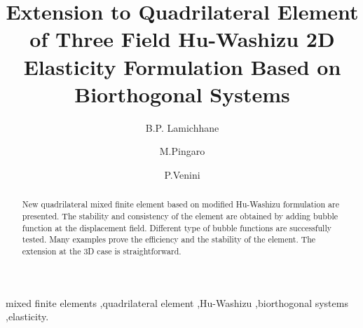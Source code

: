\documentclass[preprint,12pt,authoryear]{elsarticle}
\begin{document}
\begin{frontmatter}




\title{Extension to Quadrilateral Element of Three 
Field Hu-Washizu 2D Elasticity Formulation Based on Biorthogonal Systems}


\author{B.P. Lamichhane}
\author{M.Pingaro}
\author{P.Venini}

\address{School of Mathematical and Physical Sciences, University of Newcastle, Callaghan, NSW 2308 }
\address{Department of Civil Engineering and Architecture,
University of Pavia, Pavia, Italy }



\begin{abstract}
New quadrilateral mixed finite element based on modified Hu-Washizu formulation are presented.
The stability and consistency of the element are obtained by adding bubble function at the displacement field.
Different type of bubble functions are successfully tested. 
Many examples prove the efficiency and the stability of the element. The extension at the 3D case is straightforward.

\end{abstract}

\begin{keyword}
mixed finite elements \sep quadrilateral element \sep Hu-Washizu \sep biorthogonal systems \sep elasticity.



\end{keyword}

\end{frontmatter}
\end{document}
